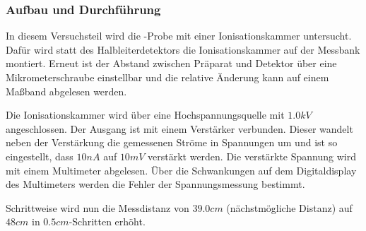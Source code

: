 \documentclass{../Misc/MontavonLaTeX/Montavon}
\begin{document}
\subsubsection{Aufbau und Durchführung}
In diesem Versuchsteil wird die -Probe mit einer Ionisationskammer untersucht. Dafür wird statt des Halbleiterdetektors die Ionisationskammer auf der Messbank montiert. Erneut ist der Abstand zwischen Präparat und Detektor über eine Mikrometerschraube einstellbar und die relative Änderung kann auf einem Maßband abgelesen werden.

Die Ionisationskammer wird über eine Hochspannungsquelle mit $1.0 \unit{kV}$ angeschlossen. Der Ausgang ist mit einem Verstärker verbunden. Dieser wandelt neben der Verstärkung die gemessenen Ströme in Spannungen um und ist so eingestellt, dass $10 \unit{nA}$ auf $10 \unit{mV}$ verstärkt werden. Die verstärkte Spannung wird mit einem Multimeter abgelesen. Über die Schwankungen auf dem Digitaldisplay des Multimeters werden die Fehler der Spannungsmessung bestimmt.

Schrittweise wird nun die Messdistanz von $39.0 \unit{cm}$ (nächstmögliche Distanz) auf $48 \unit{cm}$ in $0.5 \unit{cm}$-Schritten erhöht. 
\end{document}
